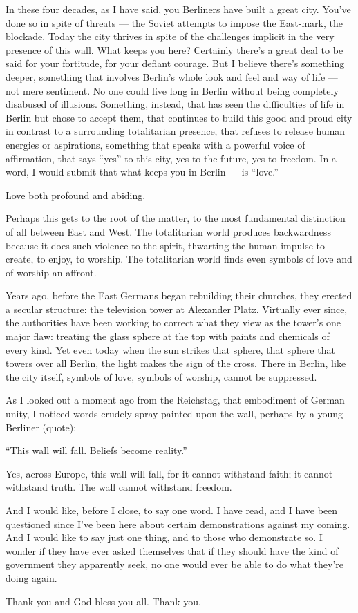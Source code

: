 \documentclass[a4paper]{amsbook}
\begin{document}
In these four decades, as I have said, you Berliners have built a great city. You've done so in spite of threats — the Soviet attempts to impose the East-mark, the blockade. Today the city thrives in spite of the challenges implicit in the very presence of this wall. What keeps you here? Certainly there's a great deal to be said for your fortitude, for your defiant courage. But I believe there's something deeper, something that involves Berlin's whole look and feel and way of life — not mere sentiment. No one could live long in Berlin without being completely disabused of illusions. Something, instead, that has seen the difficulties of life in Berlin but chose to accept them, that continues to build this good and proud city in contrast to a surrounding totalitarian presence, that refuses to release human energies or aspirations, something that speaks with a powerful voice of affirmation, that says “yes” to this city, yes to the future, yes to freedom. In a word, I would submit that what keeps you in Berlin — is “love.”

Love both profound and abiding.

Perhaps this gets to the root of the matter, to the most fundamental distinction of all between East and West. The totalitarian world produces backwardness because it does such violence to the spirit, thwarting the human impulse to create, to enjoy, to worship. The totalitarian world finds even symbols of love and of worship an affront.

Years ago, before the East Germans began rebuilding their churches, they erected a secular structure: the television tower at Alexander Platz. Virtually ever since, the authorities have been working to correct what they view as the tower's one major flaw: treating the glass sphere at the top with paints and chemicals of every kind. Yet even today when the sun strikes that sphere, that sphere that towers over all Berlin, the light makes the sign of the cross. There in Berlin, like the city itself, symbols of love, symbols of worship, cannot be suppressed.

As I looked out a moment ago from the Reichstag, that embodiment of German unity, I noticed words crudely spray-painted upon the wall, perhaps by a young Berliner (quote):

“This wall will fall. Beliefs become reality.”

Yes, across Europe, this wall will fall, for it cannot withstand faith; it cannot withstand truth. The wall cannot withstand freedom.

And I would like, before I close, to say one word. I have read, and I have been questioned since I've been here about certain demonstrations against my coming. And I would like to say just one thing, and to those who demonstrate so. I wonder if they have ever asked themselves that if they should have the kind of government they apparently seek, no one would ever be able to do what they're doing again.

Thank you and God bless you all. Thank you.
\end{document}

